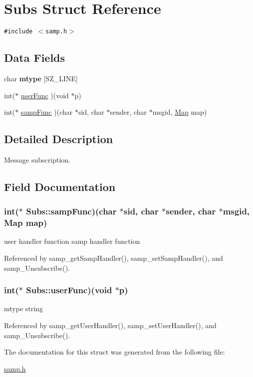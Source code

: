 \hypertarget{structSubs}{
\section{Subs Struct Reference}
\label{structSubs}
}
{\tt \#include $<$samp.h$>$}

\subsection*{Data Fields}
\begin{CompactItemize}
\item 
\hypertarget{structSubs_d8d6e6272d362d181ef4af231149dfcb}{
char \textbf{mtype} \mbox{[}SZ\_\-LINE\mbox{]}}
\label{structSubs_d8d6e6272d362d181ef4af231149dfcb}

\item 
int($\ast$ \hyperlink{structSubs_14364d5a161adc47732c39b96e8156f0}{userFunc} )(void $\ast$p)
\item 
int($\ast$ \hyperlink{structSubs_c4eca724f23609bb7ab9640c39c1001b}{sampFunc} )(char $\ast$sid, char $\ast$sender, char $\ast$msgid, \hyperlink{samp_8h_39a90bc041db57e1a6ba736ba91eee30}{Map} map)
\end{CompactItemize}


\subsection{Detailed Description}
Message subscription. 

\subsection{Field Documentation}
\hypertarget{structSubs_c4eca724f23609bb7ab9640c39c1001b}{
\subsubsection[{sampFunc}]{\setlength{\rightskip}{0pt plus 5cm}int($\ast$ {\bf Subs::sampFunc})(char $\ast$sid, char $\ast$sender, char $\ast$msgid, {\bf Map} map)}}
\label{structSubs_c4eca724f23609bb7ab9640c39c1001b}


user handler function samp handler function 

Referenced by samp\_\-getSampHandler(), samp\_\-setSampHandler(), and samp\_\-Unsubscribe().\hypertarget{structSubs_14364d5a161adc47732c39b96e8156f0}{
\subsubsection[{userFunc}]{\setlength{\rightskip}{0pt plus 5cm}int($\ast$ {\bf Subs::userFunc})(void $\ast$p)}}
\label{structSubs_14364d5a161adc47732c39b96e8156f0}


mtype string 

Referenced by samp\_\-getUserHandler(), samp\_\-setUserHandler(), and samp\_\-Unsubscribe().

The documentation for this struct was generated from the following file:\begin{CompactItemize}
\item 
\hyperlink{samp_8h}{samp.h}\end{CompactItemize}
